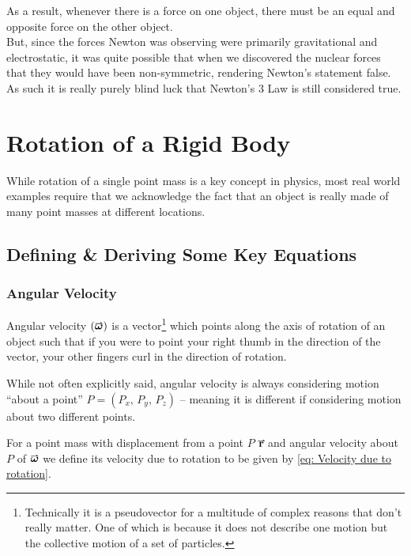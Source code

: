 \documentclass[main.tex]{subfiles}
\begin{document}
                As a result, whenever there is a force on one object, there must be an equal and opposite force on the other object.\\
                But, since the forces Newton was observing were primarily gravitational and electrostatic, it was quite possible that when we discovered the nuclear forces that they would have been non-symmetric, rendering Newton's statement false. As such it is really purely blind luck that Newton's 3 Law is still considered true.

        \newpage

        \section{Rotation of a Rigid Body}
            \label{sec: Rotation of a Rigid Body}

            While rotation of a single point mass is a key concept in physics, most real world examples require that we acknowledge the fact that an object is really made of many point masses at different locations.

            \subsection{Defining \& Deriving Some Key Equations}
                \label{subsec: Deriving Some Key Equations}

                \subsubsection{Angular Velocity}

                    Angular velocity $(\vect{\omega})$ is a vector\footnote{Technically it is a pseudovector for a multitude of complex reasons that don't really matter. One of which is because it does not describe one motion but the collective motion of a set of particles.} which points along the axis of rotation of an object such that if you were to point your right thumb in the direction of the vector, your other fingers curl in the direction of rotation.

                    While not often explicitly said, angular velocity is always considering motion ``about a point'' $P = (P_x,\, P_y,\, P_z)$ -- meaning it is different if considering motion about two different points.

                    For a point mass with displacement from a point $P$ $\vect{r}$ and angular velocity about $P$ of $\vect{\omega}$ we define its velocity due to rotation to be given by \eqref{eq: Velocity due to rotation}.
\end{document}
